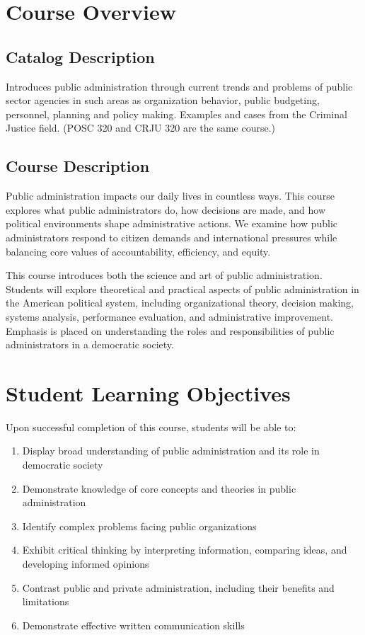 \documentclass[11pt]{scrartcl} %
\begin{document}
\section{Course Overview}

\subsection{Catalog Description}
Introduces public administration through current trends and problems of public sector agencies in such areas as organization behavior, public budgeting, personnel, planning and policy making. Examples and cases from the Criminal Justice field. (POSC 320 and CRJU 320 are the same course.)

\subsection{Course Description}
Public administration impacts our daily lives in countless ways. This course explores what public administrators do, how decisions are made, and how political environments shape administrative actions. We examine how public administrators respond to citizen demands and international pressures while balancing core values of accountability, efficiency, and equity.

This course introduces both the science and art of public administration. Students will explore theoretical and practical aspects of public administration in the American political system, including organizational theory, decision making, systems analysis, performance evaluation, and administrative improvement. Emphasis is placed on understanding the roles and responsibilities of public administrators in a democratic society.

\section{Student Learning Objectives}
Upon successful completion of this course, students will be able to:

\begin{enumerate}
\item Display broad understanding of public administration and its role in democratic society
\item Demonstrate knowledge of core concepts and theories in public administration
\item Identify complex problems facing public organizations
\item Exhibit critical thinking by interpreting information, comparing ideas, and developing informed opinions
\item Contrast public and private administration, including their benefits and limitations
\item Demonstrate effective written communication skills
\end{enumerate}
\end{document}
